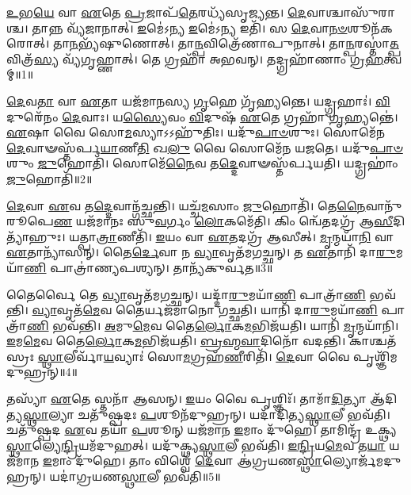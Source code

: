 \setcounter{anuvakam}{0}

\-\ul{𑌉}\-𑌭\-\ul{𑌯𑍇} 𑌵𑌾 \ul{𑌏}\-𑌤𑍇 \ul{𑌪𑍍𑌰}\-𑌜𑌾𑌪᳴\-\ul{𑌤𑍇}\-𑌰𑌧𑍍𑌯᳴𑌸𑍃𑌜𑍍𑌯𑌨𑍍𑌤।
\-\ul{𑌦𑍇}\-𑌵𑌾𑌶𑍍𑌚𑌾𑌸𑍁᳴𑌰𑌾𑌶𑍍𑌚।
𑌤𑌾𑌨𑍍𑌨 𑌵𑍍𑌯᳴𑌜𑌾𑌨𑌾𑌤𑍍।
\-\ul{𑌇}\-𑌮𑍇॑𑌽𑌨𑍍𑌯 \ul{𑌇}\-𑌮𑍇॑𑌽𑌨𑍍𑌯 𑌇𑌤𑌿᳴।
𑌸 \ul{𑌦𑍇}\-𑌵𑌾\-\ul{𑌨}\-\-\ul{𑍞}\-𑌶𑍂𑌨᳴𑌕𑌰𑍋𑌤𑍍।
𑌤𑌾\-\ul{𑌨}\-𑌭𑍍𑌯᳴𑌷𑍁𑌣𑍋𑌤𑍍।
𑌤𑌾\-\ul{𑌨𑍍𑌪}\-𑌵𑌿𑌤𑍍𑌰𑍇᳴𑌣𑌾𑌪𑍁𑌨𑌾𑌤𑍍।
𑌤𑌾\-\ul{𑌨𑍍𑌪}\-𑌰𑌸𑍍𑌤𑌾॑\-\ul{𑌤𑍍𑌪}\-𑌵𑌿𑌤𑍍𑌰᳴\-\ul{𑌸𑍍𑌯} 𑌵𑍍𑌯᳴𑌗𑍃𑌹𑍍𑌣𑌾𑌤𑍍।
𑌤𑍇 𑌗𑍍𑌰𑌹𑌾᳴ 𑌅𑌭𑌵𑌨𑍍।
𑌤𑌦𑍍𑌗𑍍𑌰𑌹𑌾᳴𑌣𑌾𑌂 𑌗𑍍𑌰\-\ul{𑌹}\-𑌤𑍍𑌵𑌮𑍍॥1॥

\-\ul{𑌦𑍇}\-𑌵\-\ul{𑌤𑌾} 𑌵𑌾 \ul{𑌏}\-𑌤𑌾 𑌯𑌜᳴𑌮𑌾𑌨𑌸𑍍𑌯 \ul{𑌗𑍃}\-𑌹𑍇 𑌗𑍃᳴𑌹𑍍𑌯𑌨𑍍𑌤𑍇।
𑌯𑌦𑍍𑌗𑍍𑌰𑌹𑌾𑌃॑।
\-\ul{𑌵𑌿}\-𑌦𑍁𑌰𑍇᳴𑌨𑌂 \ul{𑌦𑍇}\-𑌵𑌾𑌃।
𑌯\-\ul{𑌸𑍍𑌯𑍈}\-𑌵𑌂 \ul{𑌵𑌿}\-𑌦𑍁𑌷᳴ \ul{𑌏}\-𑌤𑍇 𑌗𑍍𑌰𑌹𑌾᳴ \ul{𑌗𑍃}\-𑌹𑍍𑌯𑌨𑍍𑌤𑍇॑।
\-\ul{𑌏}\-𑌷𑌾 𑌵𑍈 𑌸𑍋\-\ul{𑌮}\-𑌸𑍍𑌯𑌾\-𑌽𑌽𑌹𑍁᳴𑌤𑌿𑌃।
𑌯𑌦𑍁᳴\-\ul{𑌪𑌾}\-\-\ul{𑍞}\-𑌶𑍁𑌃।
𑌸𑍋𑌮𑍇᳴𑌨 \ul{𑌦𑍇}\-𑌵𑌾𑍟𑌸𑍍𑌤᳴𑌰𑍍𑌪\-\ul{𑌯𑌾}\-𑌣𑍀\-\ul{𑌤𑌿} 𑌖\-\ul{𑌲𑍁} 𑌵𑍈 𑌸𑍋𑌮𑍇᳴𑌨 𑌯𑌜𑌤𑍇।
𑌯𑌦𑍁᳴\-\ul{𑌪𑌾}\-\-\ul{𑍞}\-𑌶𑍁𑌂 \ul{𑌜𑍁}\-𑌹𑍋𑌤𑌿᳴।
𑌸𑍋𑌮𑍇᳴\-\ul{𑌨𑍈}\-𑌵 𑌤\-\ul{𑌦𑍍𑌦𑍇}\-𑌵𑌾𑍟𑌸𑍍𑌤᳴𑌰𑍍𑌪𑌯𑌤𑌿।
𑌯𑌦𑍍𑌗𑍍𑌰𑌹𑌾𑌂॑ \ul{𑌜𑍁}\-𑌹𑍋𑌤𑌿᳴॥2॥

\-\ul{𑌦𑍇}\-𑌵𑌾 \ul{𑌏}\-𑌵 𑌤\-\ul{𑌦𑍍𑌦𑍇}\-𑌵𑌾𑌨𑍍𑌗᳴𑌚𑍍𑌛𑌨𑍍𑌤𑌿।
𑌯𑌚𑍍𑌚᳴\-\ul{𑌮}\-𑌸𑌾𑌂 \ul{𑌜𑍁}\-𑌹𑍋𑌤𑌿᳴।
𑌤𑍇\-\ul{𑌨𑍈}\-𑌵𑌾𑌨𑍁᳴𑌰𑍂𑌪𑍇\-\ul{𑌣} 𑌯𑌜᳴𑌮𑌾𑌨𑌃 𑌸𑍁\-\ul{𑌵}\-𑌰𑍍𑌗𑌂 \ul{𑌲𑍋}\-𑌕𑌮𑍇᳴𑌤𑌿।
𑌕𑌿𑌂 𑌨𑍍𑌵𑍇᳴𑌤𑌦𑌗𑍍𑌰᳴ 𑌆\-\ul{𑌸𑍀}\-𑌦𑌿𑌤𑍍𑌯𑌾᳴𑌹𑍁𑌃।
𑌯𑌤𑍍𑌪𑌾\-\ul{𑌤𑍍𑌰𑌾}\-𑌣𑍀𑌤𑌿᳴।
\-\ul{𑌇}\-𑌯𑌂 𑌵𑌾 \ul{𑌏}\-𑌤𑌦𑌗𑍍𑌰᳴ 𑌆𑌸𑍀𑌤𑍍।
\-\ul{𑌮𑍃}\-𑌨𑍍𑌮𑌯𑌾᳴\-\ul{𑌨𑌿} 𑌵𑌾 \ul{𑌏}\-𑌤𑌾𑌨𑍍𑌯𑌾᳴𑌸𑌨𑍍।
𑌤𑍈\-\ul{𑌰𑍍𑌦𑍇}\-𑌵𑌾 𑌨 \ul{𑌵𑍍𑌯𑌾}\-𑌵𑍃𑌤᳴𑌮𑌗𑌚𑍍𑌛𑌨𑍍।
𑌤 \ul{𑌏}\-𑌤𑌾𑌨𑌿᳴ 𑌦𑌾\-\ul{𑌰𑍁}\-𑌮𑌯𑌾᳴\-\ul{𑌣𑌿} 𑌪𑌾𑌤𑍍𑌰𑌾॑𑌣𑍍𑌯𑌪𑌶𑍍𑌯𑌨𑍍।
𑌤𑌾𑌨𑍍𑌯᳴𑌕𑍁𑌰𑍍𑌵𑌤॥3॥

𑌤𑍈𑌰𑍍𑌵𑍈 𑌤𑍇 \ul{𑌵𑍍𑌯𑌾}\-𑌵𑍃𑌤᳴𑌮𑌗𑌚𑍍𑌛𑌨𑍍।
𑌯𑌦𑍍𑌦𑌾᳴\-\ul{𑌰𑍁}\-𑌮𑌯𑌾᳴\-\ul{𑌣𑌿} 𑌪𑌾𑌤𑍍𑌰𑌾᳴\-\ul{𑌣𑌿} 𑌭𑌵᳴𑌨𑍍𑌤𑌿।
\-\ul{𑌵𑍍𑌯𑌾}\-𑌵𑍃𑌤᳴\-\ul{𑌮𑍇}\-𑌵 𑌤𑍈𑌰𑍍𑌯𑌜᳴𑌮𑌾𑌨𑍋 𑌗𑌚𑍍𑌛𑌤𑌿।
𑌯𑌾𑌨𑌿᳴ 𑌦𑌾\-\ul{𑌰𑍁}\-𑌮𑌯𑌾᳴\-\ul{𑌣𑌿} 𑌪𑌾𑌤𑍍𑌰𑌾᳴\-\ul{𑌣𑌿} 𑌭𑌵᳴𑌨𑍍𑌤𑌿।
\-\ul{𑌅}\-𑌮𑍁\-\ul{𑌮𑍇}\-𑌵 𑌤𑍈\-\ul{𑌰𑍍𑌲𑍋}\-𑌕\-\ul{𑌮}\-𑌭𑌿𑌜᳴𑌯𑌤𑌿।
𑌯𑌾𑌨𑌿᳴ \ul{𑌮𑍃}\-𑌨𑍍𑌮𑌯𑌾᳴𑌨𑌿।
\-\ul{𑌇}\-𑌮\-\ul{𑌮𑍇}\-𑌵 𑌤𑍈\-\ul{𑌰𑍍𑌲𑍋}\-𑌕\-\ul{𑌮}\-𑌭𑌿𑌜᳴𑌯𑌤𑌿।
\-\ul{𑌬𑍍𑌰}\-\-\ul{𑌹𑍍𑌮}\-\-\ul{𑌵𑌾}\-𑌦𑌿𑌨𑍋᳴ 𑌵𑌦𑌨𑍍𑌤𑌿।
𑌕𑌾𑌶𑍍𑌚𑌤᳴𑌸𑍍𑌰𑌃 \ul{𑌸𑍍𑌥𑌾}\-𑌲𑍀𑌰𑍍𑌵𑌾᳴\-\ul{𑌯}\-𑌵𑍍𑌯𑌾𑌃॑ 𑌸𑍋\-\ul{𑌮}\-𑌗𑍍𑌰𑌹᳴\-\ul{𑌣𑍀}\-𑌰𑌿𑌤𑌿᳴।
\-\ul{𑌦𑍇}\-𑌵𑌾 𑌵𑍈 𑌪𑍃𑌶𑍍𑌞𑌿᳴𑌮𑌦𑍁𑌹𑍍𑌰𑌨𑍍॥4॥

𑌤𑌸𑍍𑌯𑌾᳴ \ul{𑌏}\-𑌤𑍇 𑌸𑍍𑌤𑌨𑌾᳴ 𑌆𑌸𑌨𑍍।
\-\ul{𑌇}\-𑌯𑌂 𑌵𑍈 𑌪𑍃𑌶𑍍𑌞𑌿𑌃᳴।
𑌤𑌾𑌮𑌾᳴\-\ul{𑌦𑌿}\-𑌤𑍍𑌯𑌾 𑌆᳴𑌦𑌿𑌤𑍍𑌯\-\ul{𑌸𑍍𑌥𑌾}\-𑌲𑍍𑌯𑌾 𑌚𑌤𑍁᳴𑌷𑍍𑌪𑌦𑌃 \ul{𑌪}\-𑌶𑍂𑌨᳴𑌦𑍁𑌹𑍍𑌰𑌨𑍍।
𑌯𑌦𑌾᳴𑌦𑌿𑌤𑍍𑌯\-\ul{𑌸𑍍𑌥𑌾}\-𑌲𑍀 𑌭𑌵᳴𑌤𑌿।
𑌚𑌤𑍁᳴𑌷𑍍𑌪𑌦 \ul{𑌏}\-𑌵 𑌤𑌯𑌾᳴ \ul{𑌪}\-𑌶𑍂𑌨𑍍 𑌯𑌜᳴𑌮𑌾𑌨 \ul{𑌇}\-𑌮𑌾𑌂 𑌦𑍁᳴𑌹𑍇।
𑌤𑌾𑌮𑌿𑌨𑍍𑌦𑍍𑌰᳴ 𑌉𑌕𑍍𑌥𑍍𑌯\-\ul{𑌸𑍍𑌥𑌾}\-𑌲𑍍𑌯𑍇\-\ul{𑌨𑍍𑌦𑍍𑌰𑌿}\-𑌯𑌮᳴𑌦𑍁𑌹𑌤𑍍।
𑌯𑌦𑍁᳴𑌕𑍍𑌥𑍍𑌯\-\ul{𑌸𑍍𑌥𑌾}\-𑌲𑍀 𑌭𑌵᳴𑌤𑌿।
\-\ul{𑌇}\-\-\ul{𑌨𑍍𑌦𑍍𑌰𑌿}\-𑌯\-\ul{𑌮𑍇}\-𑌵 𑌤\-\ul{𑌯𑌾} 𑌯𑌜᳴𑌮𑌾𑌨 \ul{𑌇}\-𑌮𑌾𑌂 𑌦𑍁᳴𑌹𑍇।
𑌤𑌾𑌂 𑌵𑌿𑌶𑍍𑌵𑍇᳴ \ul{𑌦𑍇}\-𑌵𑌾 𑌆॑𑌗𑍍𑌰𑌯𑌣\-\ul{𑌸𑍍𑌥𑌾}\-𑌲𑍍𑌯𑍋𑌰𑍍𑌜᳴𑌮𑌦𑍁𑌹𑍍𑌰𑌨𑍍।
𑌯𑌦𑌾॑𑌗𑍍𑌰𑌯𑌣\-\ul{𑌸𑍍𑌥𑌾}\-𑌲𑍀 𑌭𑌵᳴𑌤𑌿॥5॥

